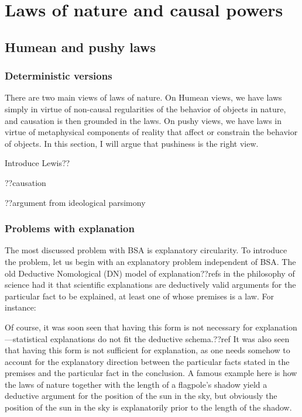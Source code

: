 \def\mychapter{IX}

\chapter{Laws of nature and causal powers}\label{ch:laws}
\section{Humean and pushy laws}
\subsection{Deterministic versions}
There are two main views of laws of nature. On Humean views, we have laws simply in virtue of non-causal 
regularities of the behavior of objects in nature, and causation is then grounded in the laws. On pushy views, 
we have laws in virtue of metaphysical components of reality that affect or constrain the behavior of objects. 
In this section, I will argue that pushiness is the right view. 

Introduce Lewis??

??causation

??argument from ideological parsimony

\subsection{Problems with explanation}\label{sec:law-explanation}
The most discussed problem with BSA is explanatory circularity. To introduce the problem, let us begin with an explanatory 
problem independent of BSA. The old Deductive Nomological (DN) model of explanation??refs in the philosophy of science had it
that scientific explanations are deductively valid arguments for the particular fact to be explained, at least one of whose premises 
is a law. For instance:

Of course, it was soon seen that having this form is not necessary for explanation---statistical explanations do not fit the
deductive schema.??ref It was also seen that having this form is not sufficient for explanation, as one needs somehow to account
for the explanatory direction between the particular facts stated in the premises and the particular fact in the conclusion.
A famous example here is how the laws of nature together with the length of a flagpole's shadow yield a deductive argument
for the position of the sun in the sky, but obviously the position of the sun in the sky is explanatorily prior to the length of
the shadow.

